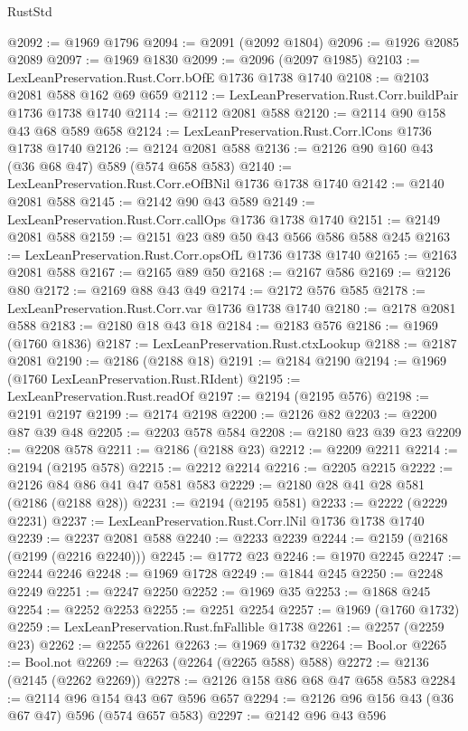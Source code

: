 \begin{lexlean}{RustStd}
\begin{coremodule}
{\begin{coremodule}
{{{{{{{{{{{{{{{@2092 := @1969 @1796
@2094 := @2091 (@2092 @1804)
@2096 := @1926 @2085 @2089
@2097 := @1969 @1830
@2099 := @2096 (@2097 @1985)
@2103 := LexLeanPreservation.Rust.Corr.bOfE @1736 @1738 @1740
@2108 := @2103 @2081 @588 @162 @69 @659
@2112 := LexLeanPreservation.Rust.Corr.buildPair @1736 @1738 @1740
@2114 := @2112 @2081 @588
@2120 := @2114 @90 @158 @43 @68 @589 @658
@2124 := LexLeanPreservation.Rust.Corr.lCons @1736 @1738 @1740
@2126 := @2124 @2081 @588
@2136 := @2126 @90 @160 @43 (@36 @68 @47) @589 (@574 @658 @583)
@2140 := LexLeanPreservation.Rust.Corr.eOfBNil @1736 @1738 @1740
@2142 := @2140 @2081 @588
@2145 := @2142 @90 @43 @589
@2149 := LexLeanPreservation.Rust.Corr.callOps @1736 @1738 @1740
@2151 := @2149 @2081 @588
@2159 := @2151 @23 @89 @50 @43 @566 @586 @588 @245
@2163 := LexLeanPreservation.Rust.Corr.opsOfL @1736 @1738 @1740
@2165 := @2163 @2081 @588
@2167 := @2165 @89 @50
@2168 := @2167 @586
@2169 := @2126 @80
@2172 := @2169 @88 @43 @49
@2174 := @2172 @576 @585
@2178 := LexLeanPreservation.Rust.Corr.var @1736 @1738 @1740
@2180 := @2178 @2081 @588
@2183 := @2180 @18 @43 @18
@2184 := @2183 @576
@2186 := @1969 (@1760 @1836)
@2187 := LexLeanPreservation.Rust.ctxLookup
@2188 := @2187 @2081
@2190 := @2186 (@2188 @18)
@2191 := @2184 @2190
@2194 := @1969 (@1760 LexLeanPreservation.Rust.RIdent)
@2195 := LexLeanPreservation.Rust.readOf
@2197 := @2194 (@2195 @576)
@2198 := @2191 @2197
@2199 := @2174 @2198
@2200 := @2126 @82
@2203 := @2200 @87 @39 @48
@2205 := @2203 @578 @584
@2208 := @2180 @23 @39 @23
@2209 := @2208 @578
@2211 := @2186 (@2188 @23)
@2212 := @2209 @2211
@2214 := @2194 (@2195 @578)
@2215 := @2212 @2214
@2216 := @2205 @2215
@2222 := @2126 @84 @86 @41 @47 @581 @583
@2229 := @2180 @28 @41 @28 @581 (@2186 (@2188 @28))
@2231 := @2194 (@2195 @581)
@2233 := @2222 (@2229 @2231)
@2237 := LexLeanPreservation.Rust.Corr.lNil @1736 @1738 @1740
@2239 := @2237 @2081 @588
@2240 := @2233 @2239
@2244 := @2159 (@2168 (@2199 (@2216 @2240)))
@2245 := @1772 @23
@2246 := @1970 @2245
@2247 := @2244 @2246
@2248 := @1969 @1728
@2249 := @1844 @245
@2250 := @2248 @2249
@2251 := @2247 @2250
@2252 := @1969 @35
@2253 := @1868 @245
@2254 := @2252 @2253
@2255 := @2251 @2254
@2257 := @1969 (@1760 @1732)
@2259 := LexLeanPreservation.Rust.fnFallible @1738
@2261 := @2257 (@2259 @23)
@2262 := @2255 @2261
@2263 := @1969 @1732
@2264 := Bool.or
@2265 := Bool.not
@2269 := @2263 (@2264 (@2265 @588) @588)
@2272 := @2136 (@2145 (@2262 @2269))
@2278 := @2126 @158 @86 @68 @47 @658 @583
@2284 := @2114 @96 @154 @43 @67 @596 @657
@2294 := @2126 @96 @156 @43 (@36 @67 @47) @596 (@574 @657 @583)
@2297 := @2142 @96 @43 @596
}}}}}}}}}}}}}}}
\end{coremodule}}
\end{coremodule}
\end{lexlean}
